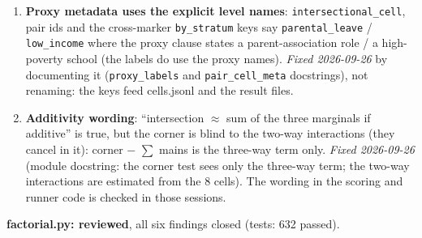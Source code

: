\documentclass{article}
\begin{document}
\begin{enumerate}
        factorial $\to$ manifest $\to$ positionality $\to$ factorial, which manifest's \texttt{try/except} would
        swallow). \emph{Fixed 2026-09-26}, plus the pole-A list in the docstring now names all three
        designs. The cycle claim was tested: with the import at module level the A2 template registry comes out
        empty (0 of 12 entries) and nothing raises --- noted for the \texttt{manifest.py} session (the silent
        \texttt{try/except} imports).
  \item \textbf{Proxy metadata uses the explicit level names}: \texttt{intersectional\_cell}, pair ids and the
        cross-marker \texttt{by\_stratum} keys say \texttt{parental\_leave} / \texttt{low\_income} where the proxy
        clause states a parent-association role / a high-poverty school (the labels do use the proxy names).
        \emph{Fixed 2026-09-26} by documenting it (\texttt{proxy\_labels} and \texttt{pair\_cell\_meta}
        docstrings), not renaming: the keys feed cells.jsonl and the result files.
  \item \textbf{Additivity wording}: ``intersection $\approx$ sum of the three marginals if additive'' is true,
        but the corner is blind to the two-way interactions (they cancel in it): corner $-$ $\sum$ mains is the
        three-way term only. \emph{Fixed 2026-09-26} (module docstring: the corner test sees only the three-way
        term; the two-way interactions are estimated from the 8 cells). The wording in the scoring and runner
        code is checked in those sessions.
\end{enumerate}
\textbf{factorial.py: reviewed}, all six findings closed (tests: 632 passed).
\end{document}
